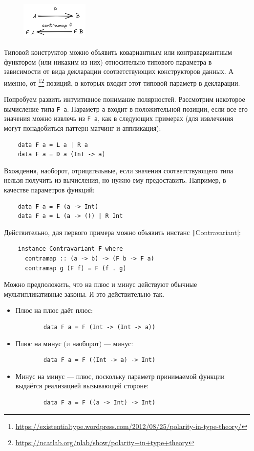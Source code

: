 \begin{figure}[H]
    \centering
    \includegraphics[width=0.3\textwidth]{figs/contra-functor}
\end{figure}

Типовой конструктор можно объявить ковариантным или контравариантным функтором (или никаким из них) относительно типового параметра в зависимости от вида декларации соответствующих конструкторов данных.
А именно, от \footnote{\url{https://existentialtype.wordpress.com/2012/08/25/polarity-in-type-theory/}}\footnote{\url{https://ncatlab.org/nlab/show/polarity+in+type+theory}} позиций, в которых входит этот типовой параметр в декларации.

Попробуем развить интуитивное понимание полярностей.
Рассмотрим некоторое вычисление типа \texttt{F a}.
Параметр \texttt{a} входит в положительной позиции, если все его значения можно извлечь из \texttt{F a}, как в следующих примерах (для извлечения могут понадобиться паттерн-матчинг и аппликация):
\begin{verbatim}
    data F a = L a | R a
    data F a = D a (Int -> a)
\end{verbatim}

Вхождения, наоборот, отрицательные, если значения соответствующего типа нельзя получить из вычисления, но нужно ему предоставить.
Например, в качестве параметров функций:
\begin{verbatim}
    data F a = F (a -> Int)
    data F a = L (a -> ()) | R Int
\end{verbatim}
Действительно, для первого примера можно объявить инстанс \texttt|Contravariant|:
\begin{verbatim}
    instance Contravariant F where
      contramap :: (a -> b) -> (F b -> F a)
      contramap g (F f) = F (f . g)
\end{verbatim}

Можно предположить, что на плюс и минус действуют обычные мультипликативные законы.
И это действительно так.
\begin{itemize}
    \item Плюс на плюс даёт плюс:
    \begin{verbatim}
        data F a = F (Int -> (Int -> a))
    \end{verbatim}
    \item Плюс на минус (и наоборот) --- минус:
    \begin{verbatim}
        data F a = F ((Int -> a) -> Int)
    \end{verbatim}
    \item Минус на минус --- плюс, поскольку параметр принимаемой функции выдаётся реализацией вызывающей стороне:
    \begin{verbatim}
        data F a = F ((a -> Int) -> Int)
    \end{verbatim}
\end{itemize}

